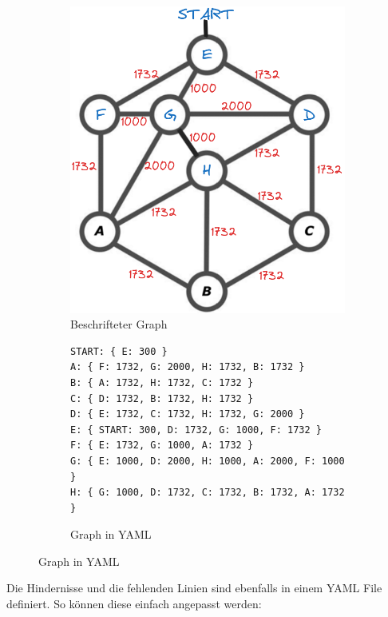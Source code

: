 \begin{figure}[H]
\begin{subfigure}{0.35\textwidth}
\includegraphics[width=0.95\linewidth]{img/graph_with_weighted_edges_1.png} 
\caption{Beschrifteter Graph}
\label{fig:labeled-graph}
\end{subfigure}
\begin{subfigure}{0.720\textwidth}
\begin{footnotesize}
\begin{verbatim}
START: { E: 300 }
A: { F: 1732, G: 2000, H: 1732, B: 1732 }
B: { A: 1732, H: 1732, C: 1732 }
C: { D: 1732, B: 1732, H: 1732 }
D: { E: 1732, C: 1732, H: 1732, G: 2000 }
E: { START: 300, D: 1732, G: 1000, F: 1732 }
F: { E: 1732, G: 1000, A: 1732 }
G: { E: 1000, D: 2000, H: 1000, A: 2000, F: 1000 }
H: { G: 1000, D: 1732, C: 1732, B: 1732, A: 1732 }
\end{verbatim}
\end{footnotesize}
\caption{Graph in YAML}
\label{fig:graph-yaml}
\end{subfigure}
\end{figure}

Die Hindernisse und die fehlenden Linien sind ebenfalls in einem YAML File definiert. So können diese einfach angepasst werden:


